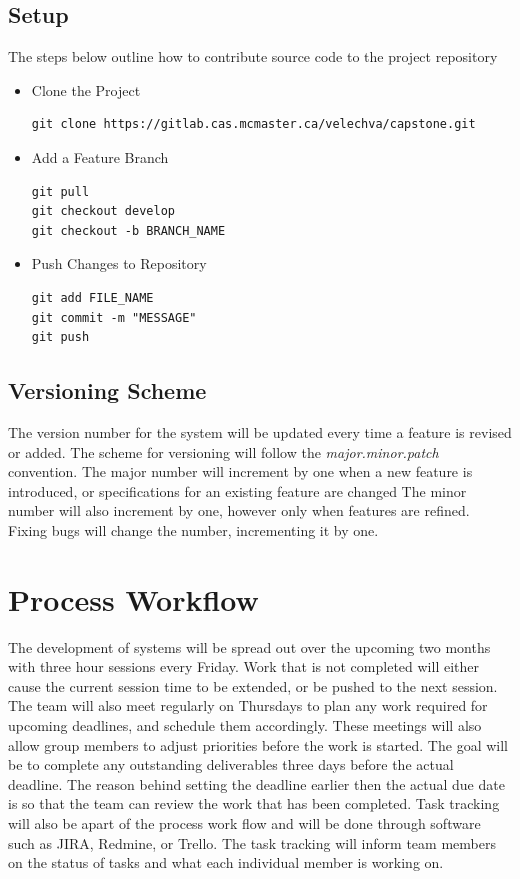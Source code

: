 \documentclass[11pt]{article}
\begin{document}
\subsection{Setup}
The steps below outline how to contribute source code to the project repository 
\begin{itemize}

\item Clone the Project
\begin{verbatim}
git clone https://gitlab.cas.mcmaster.ca/velechva/capstone.git
\end{verbatim}

\item Add a Feature Branch
\begin{verbatim}
git pull
git checkout develop
git checkout -b BRANCH_NAME
\end{verbatim}

\item Push Changes to Repository
\begin{verbatim}
git add FILE_NAME
git commit -m "MESSAGE"
git push 
\end{verbatim}



\end{itemize}

\subsection{Versioning Scheme}
The version number for the system will be updated every time a feature is revised or added. The scheme for versioning will follow the \textit{major.minor.patch} convention. The major number will increment by one when a new feature is introduced, or specifications for an existing feature are changed  The minor number will also increment by one, however only when features are refined. Fixing bugs will change the  number, incrementing it by one. 


\section{Process Workflow}

The development of systems will be spread out over the upcoming two months with three hour sessions every Friday. Work that is not completed will either cause the current session time to be extended, or be pushed to the next session. The team will also meet regularly on Thursdays to plan any work required for upcoming deadlines, and schedule them accordingly. These meetings will also allow group members to adjust priorities before the work is started. The goal will be to complete any outstanding deliverables three days before the actual deadline. The reason behind setting the deadline earlier then the actual due date is so that the team can review the work that has been completed. Task tracking will also be apart of the process work flow and will be done through software such as JIRA, Redmine, or Trello. The task tracking will inform team members on the status of tasks and what each individual member is working on. 
\end{document}

